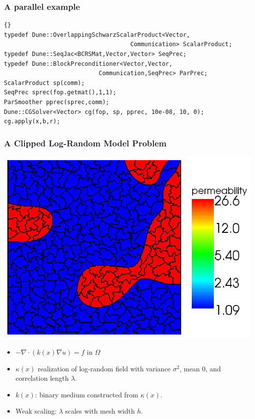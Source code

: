 \begin{frame}[fragile]
  \frametitle{A parallel example}
  \scriptsize
  \begin{lstlisting}{}
typedef Dune::OverlappingSchwarzScalarProduct<Vector,
                                    Communication> ScalarProduct;
typedef Dune::SeqJac<BCRSMat,Vector,Vector> SeqPrec;
typedef Dune::BlockPreconditioner<Vector,Vector,
                           Communication,SeqPrec> ParPrec;
ScalarProduct sp(comm);
SeqPrec sprec(fop.getmat(),1,1);
ParSmoother pprec(sprec,comm);
Dune::CGSolver<Vector> cg(fop, sp, pprec, 10e-08, 10, 0);
cg.apply(x,b,r);
\end{lstlisting}
\end{frame}

\begin{frame}
    \frametitle{A Clipped Log-Random Model Problem}
      \begin{center}
    \includegraphics[width=.4\textwidth]{EPS/aggregates_problem_f_2d_65536_cl015_var8_mean0}
  \end{center}
  
    \begin{itemize}
    \item $-\nabla \cdot (k(x) \nabla u) = f \text{ in }\Omega$
    \item $\kappa (x)$ realization of log-random field with variance
      $\sigma^2$, mean $0$, and correlation length $\lambda$.
    \item $k(x)$: binary medium constructed from $\kappa (x)$.
    \item Weak scaling: $\lambda$ scales with mesh width $h$.
    \end{itemize}
  \end{frame}

